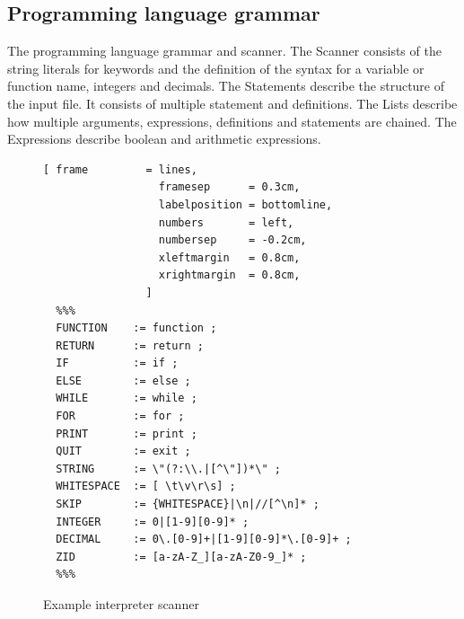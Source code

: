 \subsection{Programming language grammar}
The programming language grammar and scanner.
The Scanner  consists of the string literals for keywords and the definition of the syntax for a variable or function name, integers and decimals.
The Statements  describe the structure of the input file. It consists of multiple statement and definitions.
The Lists  describe how multiple arguments, expressions, definitions and statements are chained.
The Expressions  describe boolean and arithmetic expressions.
%
\begin{figure}[!ht]

\begin{Verbatim}[ frame         = lines, 
                  framesep      = 0.3cm, 
                  labelposition = bottomline,
                  numbers       = left,
                  numbersep     = -0.2cm,
                  xleftmargin   = 0.8cm,
                  xrightmargin  = 0.8cm,
                ]
  %%%
  FUNCTION    := function ;
  RETURN      := return ;
  IF          := if ;
  ELSE        := else ;
  WHILE       := while ;
  FOR         := for ;
  PRINT       := print ;
  QUIT        := exit ;
  STRING      := \"(?:\\.|[^\"])*\" ;
  WHITESPACE  := [ \t\v\r\s] ;
  SKIP        := {WHITESPACE}|\n|//[^\n]* ;
  INTEGER     := 0|[1-9][0-9]* ;
  DECIMAL     := 0\.[0-9]+|[1-9][0-9]*\.[0-9]+ ;
  ZID         := [a-zA-Z_][a-zA-Z0-9_]* ;  
  %%%
\end{Verbatim}
\caption{Example interpreter scanner}
\label{fig:example_interpreter_grammar_scanner}
\end{figure}
